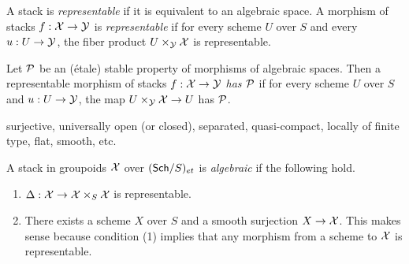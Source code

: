 \begin{definition}
   A stack is \emph{representable} if it is equivalent to an algebraic space. A morphism
   of stacks $f:\X\to \Y$ is \emph{representable} if for every scheme $U$ over $S$ and
   every $u:U\to \Y$, the fiber product $U\times_\Y \X$ is representable.
 \end{definition}
 \begin{definition}
   Let $\P$ be an (\'etale) stable property of morphisms of algebraic spaces. Then a
   representable morphism of stacks $f:\X\to \Y$ \emph{has $\P$} if for every scheme $U$
   over $S$ and $u:U\to \Y$, the map $U\times_\Y \X\to U$ has $\P$.
 \end{definition}
 \begin{example}
   surjective, universally open (or closed), separated, quasi-compact, locally of finite type, flat, smooth, etc.
 \end{example}
 \begin{definition}
   A stack in groupoids $\X$ over $(\sch/S)_{et}$ is \emph{algebraic} if the following hold.
   \begin{enumerate}
     \item $\Delta:\X\to \X\times_S \X$ is representable. 
     \item There exists a scheme $X$ over $S$ and a smooth surjection $X\to \X$. This
     makes sense because condition (1) implies that any morphism from a scheme to $\X$ is
     representable.
   \end{enumerate}
 \end{definition}
